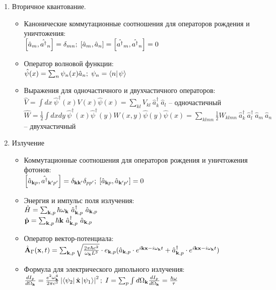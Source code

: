 \begin{enumerate}[label=\textbf{\underline{\arabic*.}}]
\begin{itemize}
        \end{itemize}
\item Вторичное квантование.  \begin{itemize}
            \item Канонические коммутационные соотношения для операторов рождения и уничтожения: \\
            $ \left[ \hat{a}_{m}, \hat{a^\dagger}_{n} \right] = \delta_{mn};\; \left[ \hat{a}_{m}, \hat{a}_{n} \right] = \left[ \hat{a^\dagger}_{m}, \hat{a^\dagger}_{n} \right] = 0 $
            \item Оператор волновой функции: \\
            $ \hat{\psi}(x) = \sum_n \psi_n(x)\hat{a}_n;\; \psi_n = \braket{n}{\psi} $
            \item Выражения для одночастичного и двухчастичного операторов: \\
            $ \hat{V} = \int dx\ \hat{\psi}^\dagger(x)V(x)\hat{\psi}(x) = \sum_{kl} V_{kl}\ \hat{a}^\dagger_k\ \hat{a}_l $ -- одночастичный \\
            $ \hat{W} = \frac12 \int dxdy\ \hat{\psi}^\dagger(x)\hat{\psi}^\dagger(y)W(x,y)\hat{\psi}(y)\hat{\psi}(x) = \sum_{klmn} \frac12 W_{klmn}\ \hat{a}^\dagger_k\ \hat{a}^\dagger_l\ \hat{a}_m\ \hat{a}_n $ -- двухчастичный

        \end{itemize}
\item Излучение  \begin{itemize}
            \item Коммутационные соотношения для операторов рождения и уничтожения фотонов: \\
            $ \left[ \hat{a}_{\mathbf{k}p}, \hat{a^\dagger}_{\mathbf{k}'p'} \right] = \delta_{\mathbf{k}\mathbf{k}'}\delta_{pp'};\; \left[ \hat{a}_{\mathbf{k}p}, \hat{a}_{\mathbf{k}'p'} \right] = 0 $
            \item Энергия и импульс поля излучения: \\
            $ \hat{H} = \sum_{\v{k},p}\hbar\omega_\v{k}\ \hat{a}^\dagger_{\v{k},p}\ \hat{a}_{\v{k},p} $\\
            $ \hat{\v{p}} = \sum_{\v{k},p}\hbar\v{k}\ \hat{a}^\dagger_{\v{k},p}\ \hat{a}_{\v{k},p} $\\
            \item Оператор вектор-потенциала: \\
            $ \hat{\mathbf{A}}_\Gamma(\mathbf{x},t) = \sum_{\mathbf{k},p}\sqrt{\frac{2\pi\hbar c^2}{\omega_{\mathbf{k}}L^3}}\cdot e_{\mathbf{k},p}(\hat{a}_{\mathbf{k},p}\cdot e^{i\mathbf{k}\mathbf{x}-i\omega_{\mathbf{k}}t}+\hat{a}^\dagger_{\mathbf{k},p}\cdot e^{i\mathbf{k}\mathbf{x}-i\omega_{\mathbf{k}}t}) $
            \item Формула для электрического дипольного излучения: \\
            $ \d{I_p}{\Omega_\v{k}} = \frac{e^2 \omega_\v{k}^4}{2\pi c^3} \abs{\matrixel{\psi_2}{\hat{\v{x}}}{\psi_1}}^2;\; I = \sum_p \int d\Omega_\v{k}\d{I_p}{\Omega_\v{k}} = \frac{\hbar\omega}{\tau} $


\end{itemize}
\end{enumerate}
